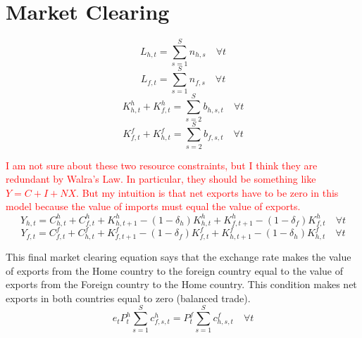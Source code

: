 \documentclass[letterpaper,12pt]{article}
\theoremstyle{definition}
\begin{document}
\section{Market Clearing}\label{SecLgOpenMC}

  \begin{equation}\label{EqLgOpenMC_Lh}
    L_{h,t} = \sum_{s=1}^S n_{h,s} \quad\forall t
  \end{equation}
  \begin{equation}\label{EqLgOpenMC_Lf}
    L_{f,t} = \sum_{s=1}^S n_{f,s} \quad\forall t
  \end{equation}
  \begin{equation}\label{EqLgOpenMC_Kh}
    K^h_{h,t} + K^h_{f,t} = \sum_{s=2}^S b_{h,s,t} \quad\forall t
  \end{equation}
  \begin{equation}\label{EqLgOpenMC_Kf}
    K^f_{f,t} + K^f_{h,t} = \sum_{s=2}^S b_{f,s,t} \quad\forall t
  \end{equation}

  \textcolor{red}{I am not sure about these two resource constraints, but I think they are redundant by Walra's Law. In particular, they should be something like $Y = C + I + NX$. But my intuition is that net exports have to be zero in this model because the value of imports must equal the value of exports.}
  \begin{equation}\label{EqLgOpenMC_Yh}
    Y_{h,t} = C^h_{h,t} + C^h_{f,t} + K^h_{h,t+1} - (1 - \delta_h)K^h_{h,t} + K^h_{f,t+1}- (1 - \delta_f)K^h_{f,t}\quad\forall t
  \end{equation}
  \begin{equation}\label{EqLgOpenMC_Yf}
    Y_{f,t} = C^f_{f,t} + C^f_{h,t} + K^f_{f,t+1} - (1 - \delta_f)K^f_{f,t} + K^f_{h,t+1}- (1 - \delta_h)K^f_{h,t} \quad\forall t
  \end{equation}

  This final market clearing equation says that the exchange rate makes the value of exports from the Home country to the foreign country equal to the value of exports from the Foreign country to the Home country. This condition makes net exports in both countries equal to zero (balanced trade).
  \begin{equation}\label{EqLgOpenMC_et}
    e_t P^h_t\sum_{s=1}^S c^h_{f,s,t} = P^f_t\sum_{s=1}^S c^f_{h,s,t} \quad\forall t
  \end{equation}
\end{document}
